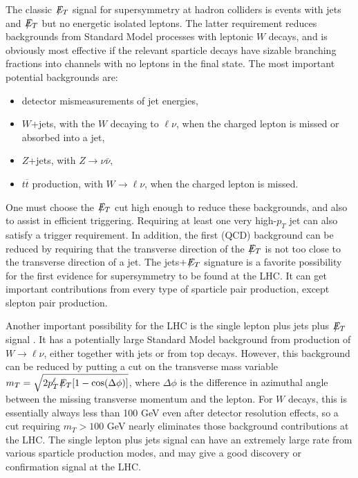 \documentclass[12pt]{article}
\def\Et{{\slashchar{E}_T}}
\def\slashchar#1{\setbox0=\hbox{$#1$}           %
   \dimen0=\wd0                                 %
   \setbox1=\hbox{/} \dimen1=\wd1               %
   \ifdim\dimen0>\dimen1                        %
      \rlap{\hbox to \dimen0{\hfil/\hfil}}      %
      #1                                        %
   \else                                        %
      \rlap{\hbox to \dimen1{\hfil$#1$\hfil}}   %
      /                                         %
   \fi}                                        %
\begin{document}
The classic $\Et$ signal for supersymmetry at hadron colliders is events 
with jets and $\Et$ but no energetic isolated leptons. The latter 
requirement reduces backgrounds from Standard Model processes with 
leptonic $W$ decays, and is obviously most effective if the relevant 
sparticle decays have sizable branching fractions into channels with no 
leptons in the final state. The most important potential backgrounds are:
\begin{itemize}
\item detector mismeasurements of jet energies,
\item $W$+jets, with the $W$ decaying to $\ell\nu$, when the charged lepton is missed or absorbed into a jet,
\item $Z$+jets, with $Z \rightarrow \nu \bar \nu$,
\item $t\overline t$ production, with $W\rightarrow \ell\nu$, when the charged lepton is 
missed.
\end{itemize}
One must choose the $\Et$ cut high enough to reduce these backgrounds, and also to assist in efficient triggering. Requiring at least one very high-$p_T$ jet can also satisfy a trigger requirement. In addition, the first (QCD) 
background can be reduced by requiring that the transverse direction of the $\Et$ is not 
too close to the transverse direction of a jet. The jets$+\Et$ signature is a favorite possibility for the 
first evidence for supersymmetry to be found at the LHC. 
It can get important contributions from 
every type of sparticle pair production, except slepton pair production.

Another important possibility for the LHC is the single lepton plus jets plus $\Et$ signal 
\cite{LHCdiscovery}. It has a potentially large Standard Model 
background from production of 
$W\rightarrow\ell\nu$, either together with jets or from top decays. 
However, this background can 
be reduced by putting a cut on the transverse mass variable 
$m_T = \sqrt{2 p_T^\ell \Et [1 - \cos(\Delta \phi)]}$, 
where $\Delta \phi$ is the difference in azimuthal angle between the missing 
transverse momentum and the lepton. For $W$ decays, this is essentially always less than 
100 GeV even after detector resolution effects, 
so a cut requiring $m_T > 100$ GeV nearly eliminates those background 
contributions at the LHC. 
The single lepton plus jets signal can have an extremely large rate from various sparticle 
production modes, and may give a good discovery or confirmation signal at the LHC.
\end{document}
